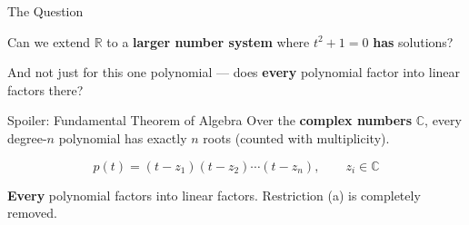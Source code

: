 \documentclass[10pt]{beamer}
\theoremstyle{definition}
\newcommand{\x}[1]{\alert{\textbf{#1}}}
\begin{document}
\begin{frame}{The Question}

Can we extend $\mathbb{R}$ to a \x{larger number system} where $t^2 + 1 = 0$ \x{has} solutions?

\vfill\pause

And not just for this one polynomial --- does \x{every} polynomial factor into linear factors there?

\vfill\pause

\begin{block}{Spoiler: Fundamental Theorem of Algebra}
Over the \x{complex numbers} $\mathbb{C}$, every degree-$n$ polynomial has exactly $n$ roots (counted with multiplicity).

\vfill

$$p(t) = (t - z_1)(t - z_2)\cdots(t - z_n), \qquad z_i \in \mathbb{C}$$

\vfill

\x{Every} polynomial factors into linear factors. Restriction (a) is completely removed.
\end{block}

\end{frame}


\end{document}
